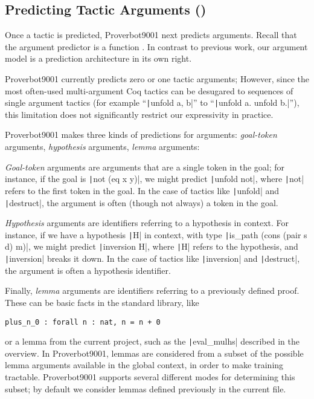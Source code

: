 \documentclass[sigplan,screen]{acmart}
\newcommand{\name}{Proverbot9001\xspace}
\newcommand{\coqinline}[1]{\texttt|#1|}
\renewcommand{\>}{\quad}
\begin{document}
\subsection{Predicting Tactic Arguments ()}
\label{ssec:arguments}

Once a tactic is predicted, \name{} next predicts arguments.
Recall that the argument predictor is a function .
In contrast to previous work, our argument model is a prediction architecture in its own right.

\name{} currently predicts zero or one tactic arguments;
However, since the most often-used multi-argument Coq tactics can be desugared to sequences of single argument tactics (for example ``\coqinline{unfold a, b}'' to ``\coqinline{unfold  a. unfold b.}''), this limitation does not significantly restrict our expressivity in practice.

\name{} makes three kinds of predictions for arguments:
  \emph{goal-token} arguments, \emph{hypothesis} arguments,
  \emph{lemma} arguments:


\emph{Goal-token} arguments are arguments that are a single token in the goal;
  for instance, if the goal is \coqinline{not (eq x y)},
  we might predict \coqinline{unfold not},
  where \coqinline{not} refers to the first token in the goal.
In the case of tactics like \coqinline{unfold} and \coqinline{destruct},
  the argument is often (though not always) a token in the goal.

\emph{Hypothesis} arguments are identifiers referring to a hypothesis in context.
For instance,
if we have a hypothesis \coqinline{H} in context,
with type \coqinline{is_path (cons (pair s d) m)},
we might predict \coqinline{inversion H},
  where \coqinline{H} refers to the hypothesis,
  and \coqinline{inversion} breaks it down.
In the case of tactics like \coqinline{inversion} and \coqinline{destruct},
  the argument is often a hypothesis identifier.

Finally, \emph{lemma} arguments are identifiers referring to a previously defined proof.
These can be basic facts in the standard library, like
\begin{verbatim}
plus_n_0 : forall n : nat, n = n + 0
\end{verbatim}
or a lemma from the current project,
  such as the \coqinline{eval_mulhs} described in the overview.
In \name{}, lemmas are considered from a subset of the possible
  lemma arguments available in the global context,
  in order to make training tractable.
\name{} supports several different modes for determining this subset;
  by default we consider lemmas defined previously in the current file.
\end{document}
